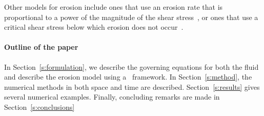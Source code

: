 \documentclass[preprint, 10pt]{elsarticle}
\begin{document}
Other models for erosion include ones that use an erosion rate that is
proportional to a power of the magnitude of the shear
stress~\cite{par-izu2000}, or ones that use a critical shear stress
below which erosion does not occur~\cite{lag2000}.


\paragraph{Outline of the paper} In Section~\ref{s:formulation}, we
describe the governing equations for both the fluid and describe the
erosion model using a \thL~framework.  In Section~\ref{s:method}, the
numerical methods in both space and time are described.
Section~\ref{s:results} gives several numerical examples.  Finally,
concluding remarks are made in Section~\ref{s:conclusions}




\end{document}
